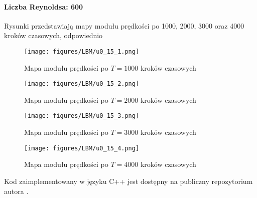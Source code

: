 \documentclass[12pt]{article}
\begin{document}
\paragraph{Liczba Reynoldsa: 600}
Rysunki przedstawiają mapy modułu prędkości po 1000, 2000, 3000 oraz 4000 kroków czasowych, odpowiednio 
\begin{figure}[H]
	\texttt{[image: figures/LBM/u0\_15\_1.png]} 
	\caption{Mapa modułu prędkości po $ T=1000 $ kroków czasowych}
\end{figure}
\begin{figure}[H]
	\texttt{[image: figures/LBM/u0\_15\_2.png]} 
	\caption{Mapa modułu prędkości po $ T=2000 $ kroków czasowych}
\end{figure}
\begin{figure}[H]
	\texttt{[image: figures/LBM/u0\_15\_3.png]} 
	\caption{Mapa modułu prędkości po $ T=3000 $ kroków czasowych}
\end{figure}
\begin{figure}[H]
	\texttt{[image: figures/LBM/u0\_15\_4.png]} 
	\caption{Mapa modułu prędkości po $ T=4000 $ kroków czasowych}
\end{figure}
Kod zaimplementowany w języku C++ jest dostępny na publiczny repozytorium autora \cite{Marek2}.
\newpage
\end{document}
